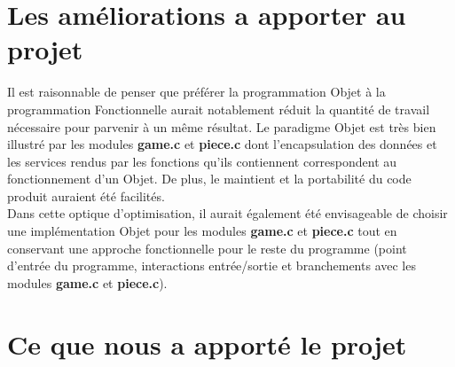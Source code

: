 \documentclass{report}
\begin{document}

\section{Les améliorations a apporter au projet}
Il est raisonnable de penser que préférer la programmation Objet à la programmation Fonctionnelle aurait notablement réduit la quantité de travail nécessaire pour parvenir à un même résultat.
Le paradigme Objet est très bien illustré par les modules \textbf{game.c} et \textbf{piece.c} dont l'encapsulation des données et les services rendus par les fonctions qu'ils contiennent correspondent au fonctionnement d'un Objet.
De plus, le maintient et la portabilité du code produit auraient été facilités.\\
Dans cette optique d'optimisation, il aurait également été envisageable de choisir une implémentation Objet pour les modules \textbf{game.c} et \textbf{piece.c} tout en conservant une approche fonctionnelle pour le reste du programme (point d'entrée du programme, interactions entrée/sortie et branchements avec les modules \textbf{game.c} et \textbf{piece.c}).

\section{Ce que nous a apporté le projet}
\end{document}
